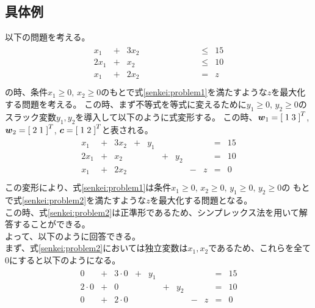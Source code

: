 \documentclass[dvipdfmx,titlepage, a4paper]{jsarticle}%
\begin{document}
\subsection{具体例}
以下の問題を考える。
\begin{eqnarray}
	\begin{array}{ccccccccccc}
		x_{1} & + & 3x_{2} & \; &\; & \;& \; &\; & \; & \leq & 15\\
		2x_{1} & + & x_{2} & \; &\; & \;& \; &\; & \; & \leq & 10\\
		x_{1} & + & 2x_{2} & \; &\; & \;& \; &\; & \; & = & z\\
	\end{array}\label{senkei:problem1}
\end{eqnarray}
の時、条件$x_{1} \geq 0, \, x_{2} \geq 0$のもとで式\eqref{senkei:problem1}を満たすような$z$を最大化する問題を考える。
この時、まず不等式を等式に変えるために$y_{1} \geq 0, \, y_{2} \geq 0$のスラック変数$y_{1}, y_{2}$を導入して以下のように式変形する。
この時、$\mbox{\boldmath $w$}_{1} = \left[ \; 1\; 3\; \right]^{T}$, $\mbox{\boldmath $w$}_{2} = \left[\; 2\; 1\; \right]^{T}$, 
$\mbox{\boldmath $c$} = \left[\; 1\; 2\; \right]^{T}$と表される。
\begin{eqnarray}
	\begin{array}{ccccccccccc}
		x_{1} & + & 3x_{2} & + & y_{1} & \;& \; &\; & \; & = & 15\\
		2x_{1} & + & x_{2} & \; &\; & + & y_{2} &\; & \; & = & 10\\
		x_{1} & + & 2x_{2} & \; &\; & \;& \; & - & z & = & 0\\
	\end{array}\label{senkei:problem2}
\end{eqnarray}
この変形により、式\eqref{senkei:problem1}は条件$x_{1} \geq 0, \, x_{2} \geq 0, \, y_{1} \geq 0, \, y_{2} \geq 0$の
もとで式\eqref{senkei:problem2}を満たすような$z$を最大化する問題となる。\\
この時、式\eqref{senkei:problem2}は正準形であるため、シンプレックス法を用いて解答することができる。\\
よって、以下のように回答できる。\\
まず、式\eqref{senkei:problem2}においては独立変数は$x_{1}, x_{2}$であるため、これらを全て0にすると以下のようになる。
\begin{eqnarray*}
	\begin{array}{lllllllllll}
		0 & + & 3 \cdot 0 & + & y_{1} & \;& \; &\; & \; & = & 15\\
		2 \cdot 0 & + & 0 & \; &\; & + & y_{2} &\; & \; & = & 10\\
		0 & + & 2 \cdot 0 & \; &\; & \;& \; & - & z & = & 0\\
	\end{array}
\end{eqnarray*}
\end{document}
